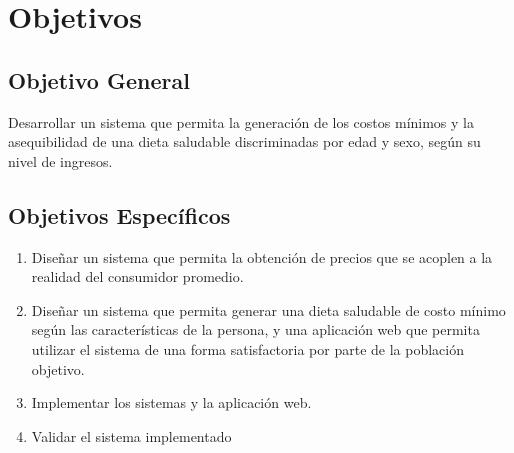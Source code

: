\section{Objetivos} \label{sec:objetivos}
\subsection{Objetivo General}
\noindent Desarrollar un sistema que permita la generaci\'on de los costos m\'inimos y la asequibilidad de una dieta saludable discriminadas por edad y sexo, seg\'un su nivel de ingresos.

\subsection{Objetivos Espec\'ificos}
\begin{enumerate}
    \item Dise\~{n}ar un sistema que permita la obtenci\'on de precios que se acoplen a la realidad del consumidor promedio.
    
    \item Dise\~{n}ar un sistema que permita generar una dieta saludable de costo m\'inimo seg\'un las caracter\'isticas de la persona, y una aplicaci\'on  web que permita utilizar el sistema de una forma satisfactoria por parte de la poblaci\'on objetivo.
    
    \item Implementar los sistemas y la aplicaci\'on web.
    
    \item Validar el sistema implementado
    
\end{enumerate}

